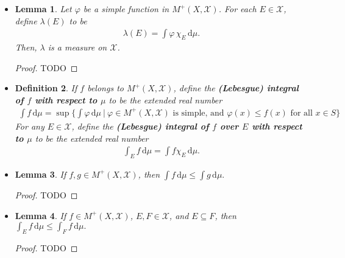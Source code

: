 \documentclass[10pt]{article}
\newtheorem{lemma}{Lemma}
\newtheorem{definition}[lemma]{Definition}
\newcommand{\dee}{\mathrm{d}}
\newcommand{\mcal}[1]{\mathcal{#1}}
\begin{document}
\begin{itemize}
  \begin{proof}
    TODO
  \end{proof}

  \item \begin{lemma}
  Let $\varphi$ be a simple function in $M^+(X, \mcal{X})$. For each $E \in \mcal{X}$, define $\lambda(E)$ to be
  \begin{align*}
    \lambda(E) = \int \varphi\, \chi_{E}\, \dee\mu.
  \end{align*}
  Then, $\lambda$ is a measure on $\mcal{X}$.
  \end{lemma}

  \begin{proof}
    TODO
  \end{proof}

  \item \begin{definition}
    If $f$ belongs to $M^+(X, \mcal{X})$, define the {\bf (Lebesgue) integral of $f$ with respect to $\mu$} to be the extended real number
    \begin{align*}
      \int f\, \dee\mu = \sup \bigg\{ \int \varphi\, \dee\mu\ \bigg| \ \varphi \in M^+(X,\mcal{X})\mbox{ is simple, and } \varphi(x) \leq f(x)\mbox{ for all }x \in S \bigg\}
    \end{align*}
    For any $E \in \mcal{X}$, define the {\bf (Lebesgue) integral of $f$ over $E$ with respect to $\mu$} to be the extended real number
    \begin{align*}
        \int_E f\, \dee \mu = \int f\chi_E\, \dee\mu.
    \end{align*}
  \end{definition}

  \item \begin{lemma}
    If $f,g \in M^+(X,\mcal{X})$, then
    $\int f\, \dee\mu \leq \int g\, \dee\mu.$    
  \end{lemma}

  \begin{proof}
    TODO
  \end{proof}

  \item \begin{lemma}
    If $f \in M^+(X,\mcal{X})$, $E,F \in \mcal{X}$, and $E \subseteq F$, then    
    $\int_E f\, \dee\mu \leq \int_F f\, \dee\mu.$    
  \end{lemma}

  \begin{proof}
    TODO
  \end{proof}


\end{itemize}
\end{document}
